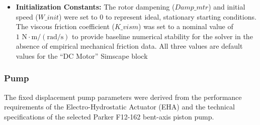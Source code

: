\documentclass[
bindingoffset=5mm,  %
footnoteindent=3mm, %
hyphenation=true    %
]{src/wut-thesis}
\begin{document}
\begin{itemize}
		\item \textbf{Initialization Constants:} The rotor dampening ($Damp\_mtr$) and initial speed ($W\_init$) were set to 0 to represent ideal, stationary starting conditions. The viscous friction coefficient ($K\_vism$) was set to a nominal value of $1 \text{ N}\cdot\text{m}/(\text{rad/s})$ to provide baseline numerical stability for the solver in the absence of empirical mechanical friction data. All three values are default values for the \enquote{DC Motor} Simscape block \cite{mw:dcmotor}
	\end{itemize}
	
	\subsubsection{Pump}
	
	The fixed displacement pump parameters were derived from the performance requirements of the Electro-Hydrostatic Actuator (EHA) and the technical specifications of the selected Parker F12-162 bent-axis piston pump.
	
\end{document}
